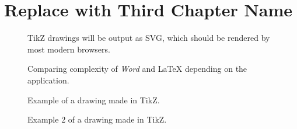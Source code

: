 \chapter{Replace with Third Chapter Name}\label{cha:c3_thirdchapter}

\begin{figure}
    \centering
    \caption{TikZ drawings will be output as SVG, which should be rendered by most modern browsers.}
\end{figure}

\begin{figure}
    \centering
    
    \caption{Comparing complexity of \textit{Word} and \LaTeX{} depending on the application.}\label{fig:latexeffortcomplexity}
\end{figure}

\begin{figure}
    \centering
    
    \caption{Example of a drawing made in TikZ.}\label{fig:leaves-golden-cut}
\end{figure}

\begin{figure}
    \centering
    
    \caption{Example 2 of a drawing made in TikZ.}\label{fig:buildchain}
\end{figure}